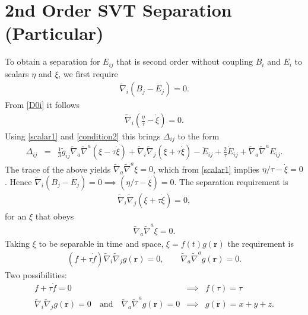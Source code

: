\documentclass[10pt,letterpaper]{article}
\numberwithin{equation}{section}
\begin{document}
\section{2nd Order SVT Separation (Particular)}
To obtain a separation for $E_{ij}$ that is second order without coupling $B_i$ and $E_i$ to scalars $\eta$ and $\xi$, we first require
\begin{eqnarray}
\tilde \nabla_i (B_j-\dot E_j) = 0.
\label{conditions1}
\end{eqnarray}
From \eqref{D0i} it follows
\begin{eqnarray}
\tilde\nabla_i \left( \frac{\eta}{\tau}-\dot\xi\right) = 0.
\label{condition2}
\end{eqnarray}
Using \eqref{scalar1} and \eqref{condition2} this brings $\Delta_{ij}$ to the form
\begin{eqnarray}
\Delta_{ij} &=& \frac{1}{3} \tilde g_{ij}\tilde\nabla_a\tilde\nabla^a (\xi-\tau\dot\xi) + \tilde\nabla_i\tilde\nabla_j (\xi+\tau\dot\xi)
- \ddot E_{ij} + \frac{2}{\tau} \dot E_{ij} + \tilde\nabla_a\tilde\nabla^a E_{ij}.
\end{eqnarray}
The trace of the above yields $\tilde\nabla_a\tilde\nabla^a \xi = 0$, which from \eqref{scalar1} implies $\eta/\tau-\dot\xi = 0$. Hence $\tilde\nabla_i (B_j-\dot E_j)=0 \implies (\eta/\tau-\dot\xi)=0$. The separation requirement is
\begin{eqnarray}
\tilde\nabla_i\tilde\nabla_j (\xi+\tau\dot \xi) = 0,
\end{eqnarray}
for an $\xi$ that obeys
\begin{eqnarray}
\tilde\nabla_a\tilde\nabla^a \xi = 0.
\end{eqnarray}
Taking $\xi$ to be separable in time and space, $\xi = f(t)g(\mathbf r)$ the requirement is
\begin{eqnarray}
(f+\tau\dot f) \tilde\nabla_i \tilde\nabla_j g(\mathbf r) =0,\qquad \tilde\nabla_a\tilde\nabla^a g(\mathbf r) =0.
\end{eqnarray}
Two possibilities:
\begin{eqnarray}
f+\tau\dot f=0&\implies& f(\tau)=\tau
\nonumber\\
\tilde\nabla_i\tilde\nabla_j g(\mathbf r) =0\quad\text{and}\quad \tilde\nabla_a\tilde\nabla^a g(\mathbf r)=0
&\implies& g(\mathbf r) = x+y+z.
\end{eqnarray}
%
\end{document}
